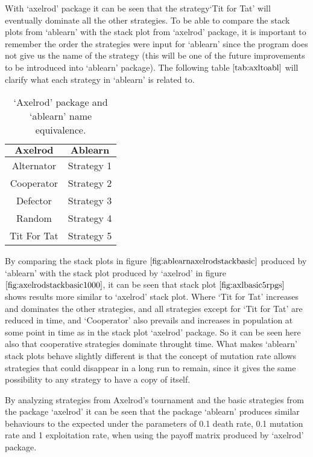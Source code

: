 With `axelrod' package it can be seen that the strategy`Tit for Tat' will eventually dominate all the other strategies. To be able to compare the stack plots from `ablearn' with the stack plot from `axelrod' package, it is important to remember the order the strategies were input for `ablearn' since the program does not give us the name of the strategy (this will be one of the future improvements to be introduced into `ablearn' package). The following table $\ref{tab:axltoabl}$ will clarify what each strategy in `ablearn' is related to.

\begin{table}[H]
\begin{center}
\begin{tabular}{|c|c|}
\hline
$\textbf{Axelrod}$& $\textbf{Ablearn}$\\ 
\hline
Alternator & Strategy 1\\
\hline
Cooperator & Strategy 2 \\
\hline
Defector & Strategy 3\\
\hline
Random & Strategy 4\\
\hline
Tit For Tat & Strategy 5\\
\hline
\end{tabular}
\end{center}
\caption{`Axelrod' package and `ablearn' name equivalence.}
\label{tab:axltoabl}
\end{table}

By comparing the stack plots in figure $\ref{fig:ablearnaxelrodstackbasic}$ produced by `ablearn' with the stack plot produced by `axelrod' in figure $\ref{fig:axelrodstackbasic1000}$, it can be seen that stack plot $\ref{fig:axlbasic5rpgs}$ shows results more similar to `axelrod' stack plot. Where `Tit for Tat' increases and dominates the other strategies, and all strategies except for `Tit for Tat' are reduced in time, and `Cooperator' also prevails and increases in population at some point in time as in the stack plot `axelrod' package. So it can be seen here also that cooperative strategies dominate throught time.  What makes `ablearn' stack plots behave slightly different is that the concept of mutation rate allows strategies that could disappear in a long run to remain, since it gives the same possibility to any strategy to have a copy of itself. 

By analyzing strategies from Axelrod's tournament and the basic strategies from the package `axelrod' it can be seen that the package `ablearn' produces similar behaviours to the expected  under the parameters of 0.1 death rate, 0.1 mutation rate and 1 exploitation rate, when using the payoff matrix produced by `axelrod' package.
